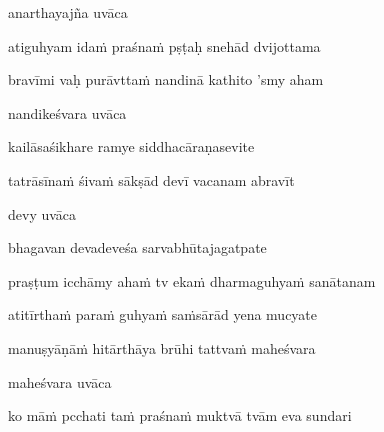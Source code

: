 anarthayajña uvāca~{\dandab}\dontdisplaylinenum 

atiguhyam idaṁ praśnaṁ pṣṭaḥ snehād dvijottama\thinspace{\danda} \dontdisplaylinenum
{}

bravīmi vaḥ purāvttaṁ nandinā kathito 'smy aham \veg\dontdisplaylinenum
{}

nandikeśvara uvāca~{\dandab}\dontdisplaylinenum 
{}

kailāsaśikhare ramye siddhacāraṇasevite\thinspace{\danda} \dontdisplaylinenum

tatrāsīnaṁ śivaṁ sākṣād devī vacanam abravīt \veg\dontdisplaylinenum

devy uvāca~{\dandab}\dontdisplaylinenum 

bhagavan devadeveśa sarvabhūtajagatpate\thinspace{\danda} \dontdisplaylinenum
{}

praṣṭum icchāmy ahaṁ tv ekaṁ dharmaguhyaṁ sanātanam \veg\dontdisplaylinenum

atitīrthaṁ paraṁ guhyaṁ saṁsārād yena mucyate\thinspace{\dandab} \dontdisplaylinenum
{}

manuṣyāṇāṁ hitārthāya brūhi tattvaṁ maheśvara \veg\dontdisplaylinenum
{}

maheśvara uvāca~{\dandab}\dontdisplaylinenum 

ko māṁ pcchati taṁ praśnaṁ muktvā tvām eva sundari\thinspace{\danda} \dontdisplaylinenum
{}

